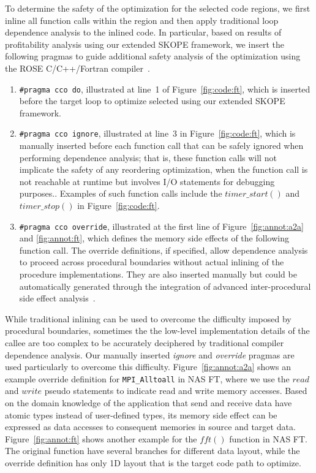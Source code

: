 To determine the safety of the optimization for the selected code regions,
  we first inline all function calls within the region and then apply traditional loop dependence analysis to the inlined code.
In particular, based on results of profitability analysis using our extended SKOPE framework, we insert the following pragmas to guide additional safety analysis of the optimization using the ROSE C/C++/Fortran compiler~\cite {ROSE}.
\begin{enumerate}
\item \texttt{\#pragma cco do}, illustrated at line~1 of Figure~\ref{fig:code:ft}, which is inserted before the target loop to optimize selected using our extended SKOPE framework.
\item \texttt{\#pragma cco ignore},
 illustrated at line~3 in Figure~\ref{fig:code:ft}, which is manually inserted before each function call that can be safely ignored when performing dependence analysis; that is, these function calls will not implicate the safety of any reordering optimization, when the function call is not reachable at runtime but involves I/O statements for debugging purposes.. Examples of such function calls include the $timer\_start()$ and $timer\_stop()$ in Figure~\ref{fig:code:ft}.

\item \texttt{\#pragma cco override},  illustrated at the first line of Figure~\ref{fig:annot:a2a} and \ref{fig:annot:ft},
which defines the memory side effects of the following function call.
The override definitions, if specified, allow dependence analysis to proceed across procedural boundaries without actual inlining of the procedure implementations. They are also inserted manually but could be automatically generated through the integration of advanced inter-procedural side effect analysis~\cite{kennedy:cpld88}.

\end{enumerate}
While traditional inlining can be used to overcome the difficulty imposed by procedural boundaries, sometimes the
 the low-level implementation details of the callee are too complex to be accurately deciphered by traditional compiler dependence analysis. Our manually inserted \emph{ignore} and \emph{override} pragmas are used particularly to overcome this difficulty.
 Figure~\ref{fig:annot:a2a} shows an example override definition for \texttt{MPI\_Alltoall} in NAS FT,
  where we use the $read$ and $write$ pseudo statements to indicate read and write memory accesses.
Based on the domain knowledge of the application that send and receive data have atomic types instead of user-defined types,
  its memory side effect can be expressed as data accesses to consequent memories in source and target data.
Figure~\ref{fig:annot:ft} shows another example for the $fft()$ function in NAS FT.
The original function have several branches for different data layout,
  while the override definition has only 1D layout that is the target code path to optimize.

